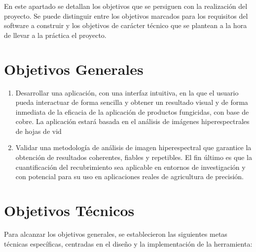 
En este apartado se detallan los objetivos que se persiguen con la realización del proyecto. Se puede distinguir entre los objetivos marcados para los requisitos del software a construir y los objetivos de carácter técnico que se plantean a la hora de llevar a la práctica el proyecto.

\section {Objetivos Generales}
\begin{enumerate}

\item Desarrollar una aplicación, con una interfaz intuitiva, en la que el usuario pueda interactuar de forma sencilla y obtener un resultado visual y de forma inmediata de la eficacia de la aplicación de productos fungicidas, con base de cobre. La aplicación estará basada en el análisis de imágenes hiperespectrales de hojas de vid

\item Validar una metodología de análisis de imagen hiperespectral que garantice la obtención de resultados coherentes, fiables y repetibles. El fin último es que la cuantificación del recubrimiento sea aplicable en entornos de investigación y con potencial para su uso en aplicaciones reales de agricultura de precisión.

\end{enumerate}

\section {Objetivos Técnicos}
Para alcanzar los objetivos generales, se establecieron las siguientes metas técnicas específicas, centradas en el diseño y la implementación de la herramienta:

